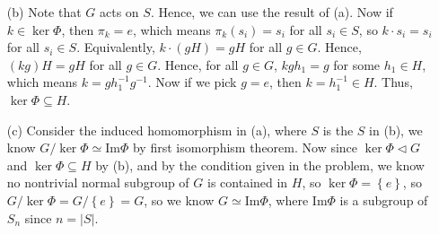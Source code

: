 \documentclass[12pt]{article}
\begin{document}
\begin{enumerate}
\begin{itemize}
        \item [(b)] Note that \(G\) acts on \(S\). Hence, we can use the result of (a). Now if \(k \in \ker \Phi \), then \(\pi _k = e\), which means \(\pi _k (s_i) = s_i\) for all \(s_i \in S\), so \(k \cdot s_i = s_i\) for all \(s_i \in S\). Equivalently, \(k \cdot (gH) = gH\) for all \(g \in G\). Hence, \((kg) H = gH\) for all \(g \in G\). Hence, for all \(g \in G\), \(kg h_1 = g\) for some \(h_1 \in H\), which means \(k = g h_1^{-1} g^{-1}\). Now if we pick \(g = e\), then \(k = h_1^{-1} \in H\). Thus, \(\ker \Phi \subseteq H\).                  
        \item [(c)] Consider the induced homomorphism in (a), where \(S\) is the \(S\) in (b), we know \(G / \ker \Phi \simeq \mathrm{Im} \Phi \) by first isomorphism theorem. Now since \(\ker \Phi \triangleleft G\) and \(\ker \Phi \subseteq H\) by (b), and by the condition given in the problem, we know no nontrivial normal subgroup of \(G\) is contained in \(H\), so \(\ker \Phi = \left\{ e \right\} \), so \(G / \ker \Phi  = G / \left\{ e \right\} = G\), so we know \(G \simeq \mathrm{Im}\Phi \), where \(\mathrm{Im} \Phi \) is a subgroup of \(S_n\) since \(n = \left\vert S \right\vert \).         
    \end{itemize}
\end{enumerate}
\end{document}
